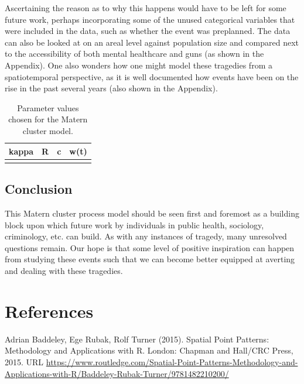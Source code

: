 \documentclass[
  12pt,
]{article}
\begin{document}
Ascertaining the reason as to why this happens would have to be left for
some future work, perhaps incorporating some of the unused categorical
variables that were included in the data, such as whether the event was
preplanned. The data can also be looked at on an areal level against
population size and compared next to the accessibility of both mental
healthcare and guns (as shown in the Appendix). One also wonders how one
might model these tragedies from a spatiotemporal perspective, as it is
well documented how events have been on the rise in the past several
years (also shown in the Appendix).

\begin{table}

\caption{\label{tab:tbl-matern-process}Parameter values chosen for the Matern cluster model.}
\centering
\begin{tabular}[t]{llrr}
\toprule
kappa & R & c & w(t)\\
\midrule
\cellcolor{gray!6}{0.0144} & \cellcolor{gray!6}{3.3597} & \cellcolor{gray!6}{0.25} & \cellcolor{gray!6}{1}\\
\bottomrule
\end{tabular}
\end{table}

\hypertarget{conclusion}{%
\subsection{Conclusion}\label{conclusion}}

This Matern cluster process model should be seen first and foremost as a
building block upon which future work by individuals in public health,
sociology, criminology, etc. can build. As with any instances of
tragedy, many unresolved questions remain. Our hope is that some level
of positive inspiration can happen from studying these events such that
we can become better equipped at averting and dealing with these
tragedies.

\newpage

\hypertarget{references}{%
\section{References}\label{references}}

Adrian Baddeley, Ege Rubak, Rolf Turner (2015). Spatial Point Patterns:
Methodology and Applications with R. London: Chapman and Hall/CRC Press,
2015. URL
\url{https://www.routledge.com/Spatial-Point-Patterns-Methodology-and-Applications-with-R/Baddeley-Rubak-Turner/9781482210200/}
\end{document}
